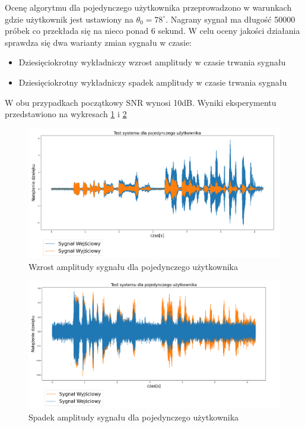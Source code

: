 Ocenę algorytmu dla pojedynczego użytkownika przeprowadzono w warunkach gdzie użytkownik jest ustawiony na $\theta_{0}=78^{\circ}$. Nagrany sygnał ma długość 50000 próbek co przekłada się na nieco ponad 6 sekund.
\noindent W celu oceny jakości działania sprawdza się dwa warianty zmian sygnału w czasie:
\begin{itemize}
    \item Dziesięciokrotny wykładniczy wzrost amplitudy w czasie trwania sygnału
    \item Dziesięciokrotny wykładniczy spadek amplitudy w czasie trwania sygnału
\end{itemize}

\noindent W obu przypadkach początkowy SNR wynosi 10dB. Wyniki eksperymentu przedstawiono na wykresach \ref{fig:single_user_increasing} i \ref{fig:single_user_decreasing}

\begin{figure}[H]
    \centering
    \includegraphics[width=\textwidth]{Images/single_user_increasing.png}
    \caption{Wzrost amplitudy sygnału dla pojedynczego użytkownika}
    \label{fig:single_user_increasing}
\end{figure}

\begin{figure}[H]
    \centering
    \includegraphics[width=\textwidth]{Images/single_user_decreasing.png}
    \caption{Spadek amplitudy sygnału dla pojedynczego użytkownika}
    \label{fig:single_user_decreasing}
\end{figure}

